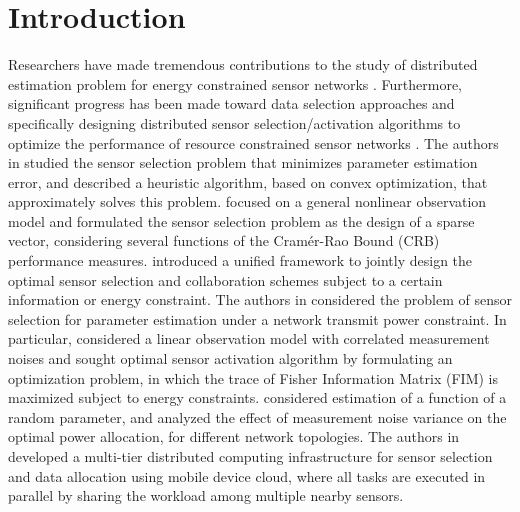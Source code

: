 \documentclass[conference]{IEEEtran}
\begin{document}
\section{Introduction} \label{Introduction}
Researchers have made tremendous contributions to the study of distributed estimation problem for energy constrained sensor networks \cite{Vosoughi_Sani_2016,Goldsmith_2006,AlRegib_2009,Giannakis_2008,Vandendorpe_2012}. Furthermore, significant progress has been made toward data selection approaches and specifically designing distributed sensor selection/activation algorithms to optimize the performance of resource constrained sensor networks \cite{Matin_2,Matin_3,Mahleqa_M3,IEEE_nights_saeid_comm_let,Boyd_sensor_selection_tsp2009,Leus_tsp_2015,Varshney_sensor_sel_and_colab_tsp_2015,Varshney_sensor_selection_tsp2016,Mitra_tsp_2008,IEEE_nights_Parsa2}. The authors in \cite{Boyd_sensor_selection_tsp2009,Leus_tsp_2015} studied the sensor selection problem that minimizes parameter estimation error, and described a heuristic algorithm, based on convex optimization, that approximately solves this problem. \cite{Leus_tsp_2015} focused on a general nonlinear observation model and formulated the sensor selection problem as the design of a sparse vector, considering several functions of the Cram\'{e}r-Rao Bound (CRB) performance measures. \cite{Varshney_sensor_sel_and_colab_tsp_2015} introduced a unified framework to jointly design the optimal sensor selection and collaboration schemes subject to a certain information or energy constraint. The authors in \cite{Varshney_sensor_selection_tsp2016,Mitra_tsp_2008} considered the problem of sensor selection for parameter estimation under a network transmit power constraint. In particular, \cite{Varshney_sensor_selection_tsp2016} considered a linear observation model with correlated measurement noises and sought optimal sensor activation algorithm by formulating an optimization problem, in which the trace of Fisher Information Matrix (FIM) is maximized subject to energy constraints. \cite{Mitra_tsp_2008} considered estimation of a function of a random parameter, and analyzed the effect of measurement noise variance on the optimal power allocation, for different network topologies. The authors in \cite{IEEE_nights_Parsa2} developed a multi-tier distributed computing infrastructure for sensor selection and data allocation using mobile device cloud, where all tasks are executed in parallel by sharing the workload among multiple nearby sensors.
\end{document}

